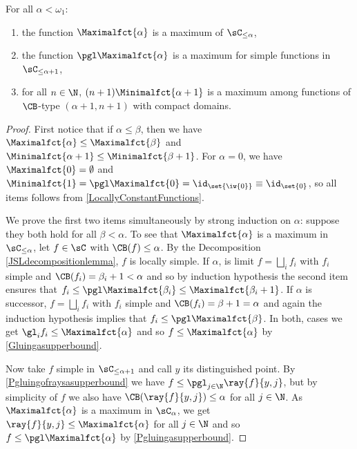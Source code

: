 \begin{Proposition}\label{Maxfunctions} 
For all $\alpha<\omega_1$:
\begin{enumerate}
\item the function $\Maximalfct{\alpha}$ is a maximum of $\sC_{\leq\alpha}$,
\item the function $\pgl \Maximalfct{\alpha}$ is a maximum for simple functions in $\sC_{\leq \alpha+1}$,
\item for all $n\in\N$, $(n+1)\Minimalfct{\alpha+1}$ is a maximum among functions of $\CB$-type $(\alpha+1,n+1)$ with compact domains.
\end{enumerate}
\end{Proposition}

\begin{proof}
First notice that if $\alpha\leq \beta$, then we have $\Maximalfct{\alpha}\leq\Maximalfct{\beta}$ and $\Minimalfct{\alpha+1}\leq\Minimalfct{\beta+1}$.
For $\alpha=0$, we have $\Maximalfct{0}=\emptyset$ and $\Minimalfct{1}=\pgl\Maximalfct{0}=\id_{\set{\iw{0}}}\equiv\id_{\set{0}}$, so all items follows from \cref{LocallyConstantFunctions}.

\smallskip

We prove the first two items simultaneously by strong induction on $\alpha$: suppose they both hold for all $\beta<\alpha$. 
To see that $\Maximalfct{\alpha}$ is a maximum in $\sC_{\leq\alpha}$, let $f\in\sC$ with $\CB(f)\leq\alpha$.
By the Decomposition \cref{JSLdecompositionlemma}, $f$ is locally simple. If $\alpha$, is limit $f=\bigsqcup_i f_i$ with $f_i$ simple and $\CB(f_i)=\beta_i+1<\alpha$ and so by induction hypothesis the second item ensures that $f_i\leq \pgl \Maximalfct{\beta_i}\leq \Maximalfct{\beta_i+1}$. If $\alpha$ is successor, $f=\bigsqcup_i f_i$ with $f_i$ simple and $\CB(f_i)=\beta+1=\alpha$ and again the induction hypothesis implies that $f_i\leq \pgl \Maximalfct{\beta}$. In both, cases we get $\gl_{i}f_i\leq \Maximalfct{\alpha}$ and so $f\leq \Maximalfct{\alpha}$ by \cref{Gluingasupperbound}.

Now take $f$ simple in $\sC_{\leq \alpha+1}$ and call $y$ its distinguished point.
By \cref{Pgluingofraysasupperbound} we have $f\leq\pgl_{j\in\N}\ray{f}{y,j}$, but by simplicity of $f$ we also have $\CB(\ray{f}{y,j})\leq\alpha$ for all $j\in\N$. As $\Maximalfct{\alpha}$ is a maximum in $\sC_{\alpha}$, we get $\ray{f}{y,j}\leq\Maximalfct{\alpha}$ for all $j\in \N$ and so $f\leq \pgl\Maximalfct{\alpha}$ by \cref{Pgluingasupperbound}.


\end{proof}
